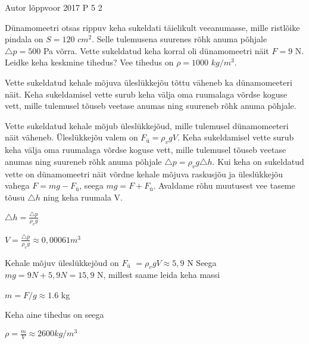 {Autor} %
{lõppvoor} %
{2017} %
{P 5} %
{2} %
{

\ifStatement
Dünamomeetri otsas rippuv keha sukeldati täielikult veeanumasse, mille ristlõike pindala on $S = 120$ $cm^2$. Selle tulemusena suurenes rõhk anuma põhjale $\triangle p = 500$ Pa võrra. Vette sukeldatud keha korral oli dünamomeetri näit $F = 9$ N. Leidke keha keskmine tihedus? Vee tihedus on $\rho = 1000$ $kg/m^3$.
\fi

\ifHint
Vette sukeldatud kehale mõjuva üleslükkejõu tõttu väheneb ka dünamomeeteri näit. Keha sukeldamisel vette surub keha välja oma ruumalaga võrdse koguse vett, mille tulemusel tõuseb veetase anumas ning suureneb rõhk anuma põhjale.
\fi

\ifSolution
Vette sukeldatud kehale mõjub üleslükkejõud, mille tulemusel dünamomeeteri näit väheneb. Üleslükkejõu valem on ${F_ü} = \rho_v g V$. 
\newline
Keha sukeldamisel vette surub keha välja oma ruumalaga võrdse koguse vett, mille tulemusel tõuseb veetase anumas ning suureneb rõhk anuma põhjale $\triangle p = \rho_v g \triangle h$.
\newline
Kui keha on sukeldatud vette on dünamomeetri näit võrdne kehale mõjuva raskusjõu ja üleslükkejõu vahega $F = mg - {F_ü}$, seega $mg = F + {F_ü}$.
\newline
Avaldame rõhu muutusest vee taseme tõusu $\triangle h$ ning keha ruumala V.
\begin{center}
$\triangle h = \frac{\triangle p}{\rho_v g}$ 
\end{center}
\begin{center}
$V = \frac{\triangle p}{\rho_v g} \approx 0,00061 m^3$
\end{center}
Kehale mõjuv üleslükkejõud on ${F_ü}$ $= \rho_v g V \approx 5,9$ N
\newline
Seega $m g = 9 N + 5,9 N = 15,9$ N, millest saame leida keha massi
\begin{center}
$m = F/g \approx 1.6$ kg
\end{center}
Keha aine tihedus on seega
\begin{center}
$\rho = \frac{m}{V} \approx 2600 kg/m^3$
\end{center}
\fi
}
